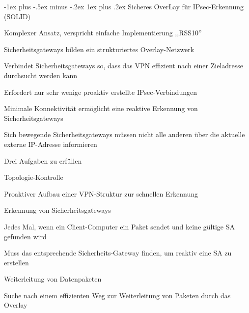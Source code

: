 \documentclass[a4paper]{article}
\makeatletter
\renewcommand{\subsubsection}{\@startsection{subsubsection}{3}{0mm}%
 {-1ex plus -.5ex minus -.2ex}%
 {1ex plus .2ex}%
 {\normalfont\small\bfseries}}
\makeatother
\begin{document}
\begin{multicols}{3}
\begin{itemize*}
            \subsubsection{Sicheres OverLay für IPsec-Erkennung
                  (SOLID)}
            \begin{itemize*}
                  \item Komplexer Ansatz, verspricht einfache Implementierung ,,RSS10''
                  \item Sicherheitsgateways bilden ein strukturiertes Overlay-Netzwerk
                  \begin{itemize*}
                        \item Verbindet Sicherheitsgateways so, dass das VPN effizient nach einer Zieladresse durchsucht werden kann
                  \end{itemize*}
                  \item Erfordert nur sehr wenige proaktiv erstellte IPsec-Verbindungen
                  \begin{itemize*}
                        \item Minimale Konnektivität ermöglicht eine reaktive Erkennung von Sicherheitsgateways
                        \item Sich bewegende Sicherheitsgateways müssen nicht alle anderen über die aktuelle externe IP-Adresse informieren
                  \end{itemize*}
                  \item Drei Aufgaben zu erfüllen
                  \begin{itemize*}
                        \item Topologie-Kontrolle
                        \begin{itemize*} \item Proaktiver Aufbau einer VPN-Struktur zur schnellen Erkennung \end{itemize*}
                        \item Erkennung von Sicherheitsgateways
                        \begin{itemize*} \item Jedes Mal, wenn ein Client-Computer ein Paket sendet und keine gültige SA gefunden wird \item Muss das entsprechende Sicherheits-Gateway finden, um reaktiv eine SA zu erstellen \end{itemize*}
                        \item Weiterleitung von Datenpaketen
                        \begin{itemize*} \item Suche nach einem effizienten Weg zur Weiterleitung von Paketen durch das Overlay \end{itemize*}
                  \end{itemize*}
            \end{itemize*}


\end{itemize*}
\end{multicols}
\end{document}
